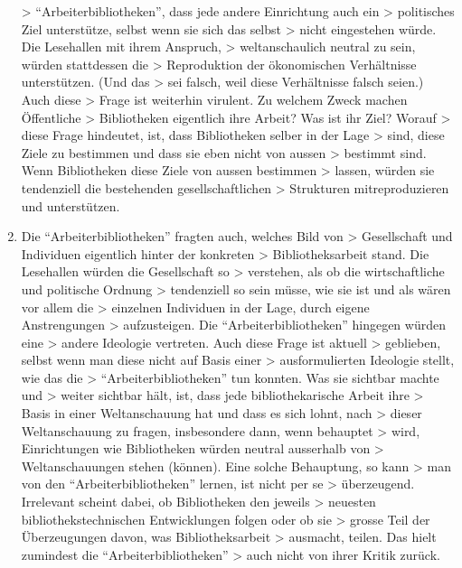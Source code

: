 \documentclass[a4paper,
fontsize=11pt,
oneside,
numbers=noperiodatend,
parskip=half-,
bibliography=totoc,
final
]{scrartcl}
\begin{document}
\begin{enumerate}
  \textgreater{} \enquote{Arbeiterbibliotheken}, dass jede andere
  Einrichtung auch ein \textgreater{} politisches Ziel unterstütze,
  selbst wenn sie sich das selbst \textgreater{} nicht eingestehen
  würde. Die Lesehallen mit ihrem Anspruch, \textgreater{}
  weltanschaulich neutral zu sein, würden stattdessen die \textgreater{}
  Reproduktion der ökonomischen Verhältnisse unterstützen. (Und das
  \textgreater{} sei falsch, weil diese Verhältnisse falsch seien.) Auch
  diese \textgreater{} Frage ist weiterhin virulent. Zu welchem Zweck
  machen Öffentliche \textgreater{} Bibliotheken eigentlich ihre Arbeit?
  Was ist ihr Ziel? Worauf \textgreater{} diese Frage hindeutet, ist,
  dass Bibliotheken selber in der Lage \textgreater{} sind, diese Ziele
  zu bestimmen und dass sie eben nicht von aussen \textgreater{}
  bestimmt sind. Wenn Bibliotheken diese Ziele von aussen bestimmen
  \textgreater{} lassen, würden sie tendenziell die bestehenden
  gesellschaftlichen \textgreater{} Strukturen mitreproduzieren und
  unterstützen.
\item
  Die \enquote{Arbeiterbibliotheken} fragten auch, welches Bild von
  \textgreater{} Gesellschaft und Individuen eigentlich hinter der
  konkreten \textgreater{} Bibliotheksarbeit stand. Die Lesehallen
  würden die Gesellschaft so \textgreater{} verstehen, als ob die
  wirtschaftliche und politische Ordnung \textgreater{} tendenziell so
  sein müsse, wie sie ist und als wären vor allem die \textgreater{}
  einzelnen Individuen in der Lage, durch eigene Anstrengungen
  \textgreater{} aufzusteigen. Die \enquote{Arbeiterbibliotheken}
  hingegen würden eine \textgreater{} andere Ideologie vertreten. Auch
  diese Frage ist aktuell \textgreater{} geblieben, selbst wenn man
  diese nicht auf Basis einer \textgreater{} ausformulierten Ideologie
  stellt, wie das die \textgreater{} \enquote{Arbeiterbibliotheken} tun
  konnten. Was sie sichtbar machte und \textgreater{} weiter sichtbar
  hält, ist, dass jede bibliothekarische Arbeit ihre \textgreater{}
  Basis in einer Weltanschauung hat und dass es sich lohnt, nach
  \textgreater{} dieser Weltanschauung zu fragen, insbesondere dann,
  wenn behauptet \textgreater{} wird, Einrichtungen wie Bibliotheken
  würden neutral ausserhalb von \textgreater{} Weltanschauungen stehen
  (können). Eine solche Behauptung, so kann \textgreater{} man von den
  \enquote{Arbeiterbibliotheken} lernen, ist nicht per se \textgreater{}
  überzeugend. Irrelevant scheint dabei, ob Bibliotheken den jeweils
  \textgreater{} neuesten bibliothekstechnischen Entwicklungen folgen
  oder ob sie \textgreater{} grosse Teil der Überzeugungen davon, was
  Bibliotheksarbeit \textgreater{} ausmacht, teilen. Das hielt zumindest
  die \enquote{Arbeiterbibliotheken} \textgreater{} auch nicht von ihrer
  Kritik zurück.
\end{enumerate}
\end{document}
